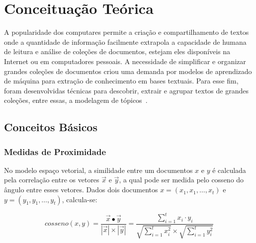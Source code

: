 \chapter{Conceituação Teórica}\label{cap2}



A popularidade dos computares permite a criação e compartilhamento de textos onde a quantidade de informação facilmente extrapola a capacidade de humana de leitura e análise de coleções de documentos, estejam eles disponíveis na Internet ou em computadores pessoais. A necessidade de simplificar e organizar grandes coleções de documentos criou uma demanda por modelos de aprendizado de máquina para extração de conhecimento em bases textuais. Para esse fim, foram desenvolvidas técnicas para descobrir, extrair e agrupar textos de grandes coleções, entre essas, a modelagem de tópicos~\cite{Hofmann1999,Deerwester1990,Lee1999,Blei2012}.  %


\section{Conceitos Básicos}




\subsection{Medidas de Proximidade}
No modelo espaço vetorial, a similidade entre um documentos $x$ e $y$ é calculada pela correlação entre os vetores $\vec{x}$ e $\vec{y}$, a qual pode ser medida pelo cosseno do  ângulo entre esses vetores. Dados dois documentos $x = (x_1, x_1, \dots, x_t)$ e $y = (y_1, y_1, \dots, y_t)$, calcula-se: 




\begin{equation}
cosseno(x, y) = \frac{ \vec{x} \bullet \vec{y} }
                   { |\vec{x}| \times | \vec{y}|}
            = \frac{ \sum_{i=1}^{t} x_i \cdot y_i}
                   { \sqrt{\sum_{i=1}^{t} x_i^2} \times \sqrt{\sum_{i=1}^{t} y_i^2 } }                   \label{equ:cosseno-doc-consulta}		                   
\end{equation} 

